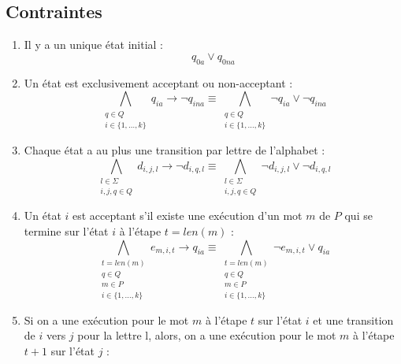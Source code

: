\documentclass[a4paper, 12pt]{extarticle}
\begin{document}
\subsection{Contraintes} %
\label{sub:contraintes}

\begin{enumerate}
    \item Il y a un unique état initial :
    \begin{equation*}
        q_{0a} \vee q_{0na}
    \end{equation*}
    \item Un état est exclusivement acceptant ou non-acceptant :
    \begin{equation*}
        \bigwedge_{\substack{q\in Q \\ i\in \{1,\dots,k\}}} q_{ia} \rightarrow \neg q_{ina}\equiv
        \bigwedge_{\substack{q\in Q \\ i\in \{1,\dots,k\}}} \neg q_{ia} \vee \neg q_{ina}
    \end{equation*}
    \item Chaque état a au plus une transition par lettre de l'alphabet :
    \begin{equation*}
        \bigwedge_{\substack{l\in \Sigma\\i,j,q \in Q}} d_{i,j,l} \rightarrow \neg d_{i,q,l}\equiv
        \bigwedge_{\substack{l\in \Sigma\\i,j,q \in Q}}\neg d_{i,j,l} \vee \neg d_{i,q,l}
    \end{equation*}
    \item Un état $i$ est acceptant s'il existe une exécution d'un mot $m$ de $P$ qui se termine sur l'état $i$ à l'étape $t=len(m)$ :
    \begin{equation*}
        \bigwedge_{\substack{t=len(m)\\q \in Q\\ m \in P\\ i \in \{1,\dots,k\}}} e_{m,i,t} \rightarrow q_{ia} \equiv
        \bigwedge_{\substack{t=len(m)\\q \in Q\\ m \in P\\ i \in \{1,\dots,k\}}} \neg e_{m,i,t} \vee q_{ia}
    \end{equation*}
    \item Si on a une exécution pour le mot $m$ à l'étape $t$ sur l'état $i$ et une transition de $i$ vers $j$ pour la lettre l,
    alors, on a une exécution pour le mot $m$ à l'étape $t+1$ sur l'état $j$ :
    \begin{equation*}

\end{equation*}
\end{enumerate}
\end{document}
